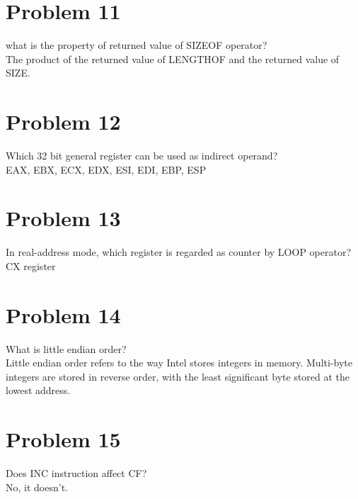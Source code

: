 \documentclass[paper=a4, fontsize=11pt]{scrartcl} %
\numberwithin{equation}{section} %
\numberwithin{figure}{section} %
\numberwithin{table}{section} %
\begin{document}
\section{Problem 11}
what is the property of returned value of SIZEOF operator?\\
The product of  the returned value of LENGTHOF and the returned value of SIZE.

\section{Problem 12}
Which 32 bit general register can be used as indirect operand?\\
EAX, EBX, ECX, EDX, ESI, EDI, EBP, ESP

\section{Problem 13}
In real-address mode, which register is regarded as counter by LOOP operator? \\
CX register

\section{Problem 14}
What is little endian order? \\
Little endian order refers to the way Intel stores integers in memory. Multi-byte integers are stored in reverse order, with the least significant byte stored at the lowest address.

\section{Problem 15}
Does INC instruction affect CF? \\
No, it doesn't.
\end{document}
